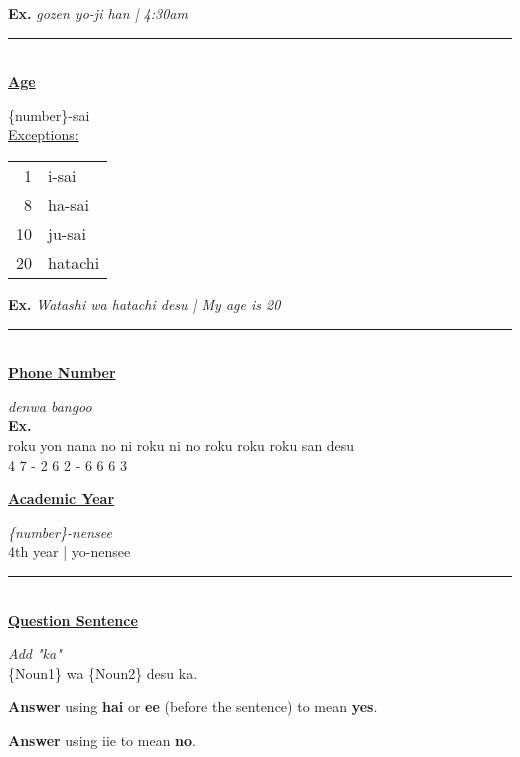 \documentclass{article}
\begin{document}
{\bf Ex.} {\it gozen yo-ji han | 4:30am}\\

\rule{6in}{0.4pt}\\

\underline{\bf Age}

\{number\}-sai\\

\underline{Exceptions:}

\begin{tabular}{ r l }
1 & i-sai\\
8 & ha-sai\\
10 & ju-sai\\
20 & hatachi\\
\end{tabular}

{\bf Ex.} {\it Watashi wa hatachi desu | My age is 20}\\

\rule{6in}{0.4pt}\\

\underline{\bf Phone Number}

{\it denwa bangoo}\\

{\bf Ex.}\\
\indent roku yon nana no ni roku ni no roku roku roku san desu\\
 4 7 - 2 6 2 - 6 6 6 3\\

\newpage

\underline{\bf Academic Year}

{\it \{number\}-nensee}\\

4th year | yo-nensee\\

\rule{6in}{0.4pt}\\

\underline{\bf \large Question Sentence}

{\it Add "ka"}\\

\{Noun1\} wa \{Noun2\} desu ka.

{\bf Answer} using {\bf hai} or {\bf ee} (before the sentence) to mean {\bf yes}.

{\bf Answer} using {iie} to mean {\bf no}.\\
\end{document}
